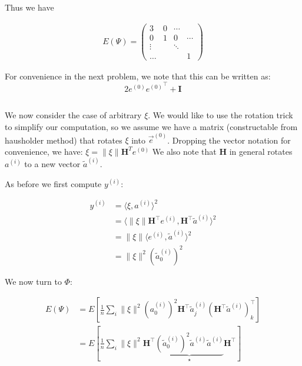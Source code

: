 \documentclass{article}
\begin{document}
Thus we have 

\begin{equation}
\begin{split}
	E\left(\Psi\right)  = \begin{pmatrix}
		3& 0& \cdots  &\\
		0& 1& 0& \cdots \\
		\vdots &  & \ddots & \\
		\dots &&&1 
	\end{pmatrix}
\end{split}
\end{equation}

For convenience in the next problem, we note that this can be written as: \[2e^{(0)}{e^{(0)}}^\intercal + \boldsymbol{I}\]

\subsection{}

We now consider the case of arbitrary $\xi$. 
We would like to use the rotation trick to simplify our computation, so we assume we have a matrix (constructable from hausholder method) that rotates $\xi$ into $\vec{e}^{(0)}$. 
Dropping the vector notation for convenience, we have: $\xi = \lVert \xi\rVert \boldsymbol{H}^T e^{(0)}$
We also note that $\boldsymbol{H}$ in general rotates $a^{(i)}$ to a new vector $\tilde{a}^{(i)}$. 

As before we first compute $y^{(i)}$:

\begin{equation}
	\begin{split}
		y^{(i)} &= \langle \xi , a^{(i)}\rangle ^2 \\
			&= \langle \lVert\xi\rVert\boldsymbol{H}^\intercal e^{(i)} , \boldsymbol{H}^\intercal \tilde{a}^{(i)}\rangle^2 \\
			&= \lVert\xi\rVert\langle e^{(i)}, \tilde{a}^{(i)}\rangle ^2\\ 
			&=  \lVert\xi\rVert^2 \left(\tilde{a}^{(i)}_0\right)^2
	\end{split}
\end{equation}

We now turn to $\Phi$:


\begin{equation}
\begin{split}
	E\left(\Psi\right)  &= E\left[\frac{1}{n}\sum_{i}\lVert\xi\rVert^2\left(a^{(i)}_0\right)^2 
	\boldsymbol{H}^\intercal \tilde{a}^{(i)}_j \left(\boldsymbol{H}^\intercal \tilde{a}^{(i)}\right)^\intercal_k\right] \\  
			    &= E\left[\frac{1}{n}\sum_{i}\lVert\xi\rVert^2\boldsymbol{H}^\intercal \underbrace{ \left(\tilde{a}^{(i)}_0\right)^2 \tilde{a}^{(i)}\tilde{a}^{(i)}}_{\star}\boldsymbol{H}^\intercal \right]
\end{split}
\end{equation}
\end{document}
